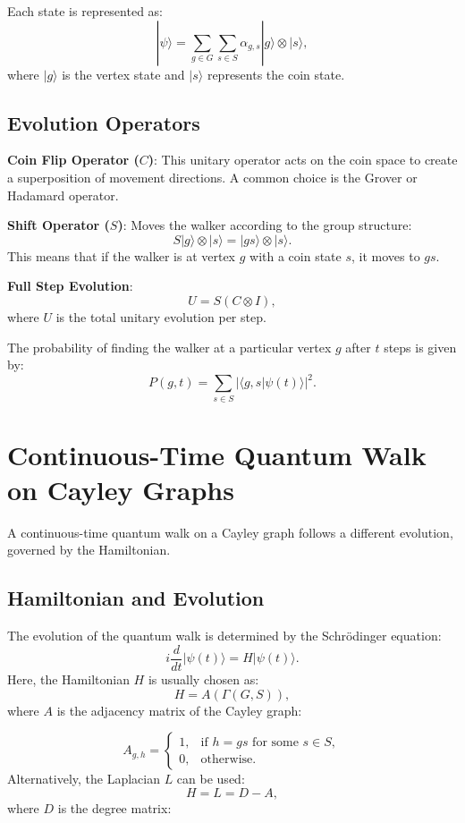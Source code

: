 \documentclass[11pt]{article}
\theoremstyle{definition}
\begin{document}
Each state is represented as:
\[
|\psi\rangle = \sum_{g \in G} \sum_{s \in S} \alpha_{g,s} |g\rangle \otimes |s\rangle,
\]
where \( |g\rangle \) is the vertex state and \( |s\rangle \) represents the coin state.

\subsection*{Evolution Operators}
\textbf{Coin Flip Operator (\( C \))}: This unitary operator acts on the coin space to create a superposition of movement directions. A common choice is the Grover or Hadamard operator.

\textbf{Shift Operator (\( S \))}: Moves the walker according to the group structure:
\[
S |g\rangle \otimes |s\rangle = |gs\rangle \otimes |s\rangle.
\]
This means that if the walker is at vertex \( g \) with a coin state \( s \), it moves to \( gs \).

\textbf{Full Step Evolution}:
\[
U = S (C \otimes I),
\]
where \( U \) is the total unitary evolution per step.

The probability of finding the walker at a particular vertex \( g \) after \( t \) steps is given by:
\[
P(g, t) = \sum_{s \in S} |\langle g, s | \psi(t) \rangle |^2.
\]


\section*{Continuous-Time Quantum Walk on Cayley Graphs}

A continuous-time quantum walk on a Cayley graph follows a different evolution, governed by the Hamiltonian.

\subsection*{Hamiltonian and Evolution}
The evolution of the quantum walk is determined by the Schrödinger equation:
\[
i \frac{d}{dt} |\psi(t)\rangle = H |\psi(t)\rangle.
\]
Here, the Hamiltonian \( H \) is usually chosen as:
\[
H = A(\Gamma(G,S)),
\]
where \( A \) is the adjacency matrix of the Cayley graph:

\[
A_{g,h} =
\begin{cases}
1, & \text{if } h = gs \text{ for some } s \in S, \\
0, & \text{otherwise}.
\end{cases}
\]
 Alternatively, the Laplacian \( L \) can be used:
\[
H = L = D - A,
\]
where \( D \) is the degree matrix:
\end{document}
